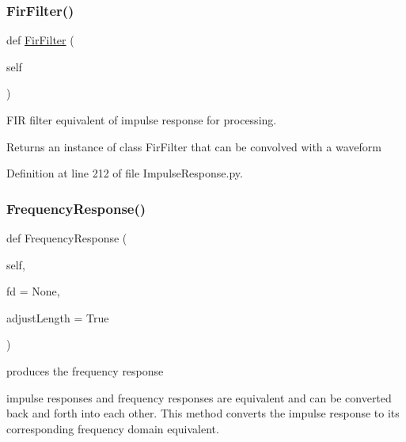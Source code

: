 \subsubsection{\texorpdfstring{Fir\+Filter()}{FirFilter()}}
{\footnotesize\ttfamily def \hyperlink{classSignalIntegrity_1_1TimeDomain_1_1Filters_1_1FirFilter_1_1FirFilter}{Fir\+Filter} (\begin{DoxyParamCaption}\item[{}]{self }\end{DoxyParamCaption})}



F\+IR filter equivalent of impulse response for processing. 

\begin{DoxyReturn}{Returns}
an instance of class Fir\+Filter that can be convolved with a waveform 
\end{DoxyReturn}


Definition at line 212 of file Impulse\+Response.\+py.

\mbox{\label{classSignalIntegrity_1_1TimeDomain_1_1Waveform_1_1ImpulseResponse_1_1ImpulseResponse_a8a375a8188c5b58fa6f933db5737ddd1}} 
\subsubsection{\texorpdfstring{Frequency\+Response()}{FrequencyResponse()}}
{\footnotesize\ttfamily def Frequency\+Response (\begin{DoxyParamCaption}\item[{}]{self,  }\item[{}]{fd = {\ttfamily None},  }\item[{}]{adjust\+Length = {\ttfamily True} }\end{DoxyParamCaption})}



produces the frequency response 

impulse responses and frequency responses are equivalent and can be converted back and forth into each other. This method converts the impulse response to its corresponding frequency domain equivalent.


